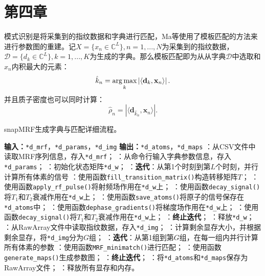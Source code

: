 \chapter{第四章}
\label{chap:chap4}
模式识别是将采集到的指纹数据和字典进行匹配，Ma等\cite{mrf}使用了模板匹配的方法来进行参数图的重建。记$X=\{x_n\in \mathbb{C}^L\}, n=1,...,N$为采集到的指纹数据，$\mathcal{D}=\{d_k\in \mathbb{C}^L\},k=1,...,K$为生成的字典。那么模板匹配即为从从字典$\mathcal{D}$中选取和$x_n$内积最大的元素：
	\begin{equation}
	\hat{k}_n = \operatorname*{arg\,max}_k \left|\left\langle \mathbf{d}_k,\mathbf{x}_n \right\rangle \right|.
	\end{equation}
并且质子密度也可以同时计算：
	\begin{equation}
	\hat{\rho}_n=\left|\langle \mathbf{d}_{\hat{k}_n},\mathbf{x}_n \rangle\right|.
	\end{equation}

\begin{algorithm}
	\caption{snapMRF生成字典与匹配详细流程。}
	\label{alg:snapMRF}
	\begin{algorithmic}
		\INDSTATE[-1.25] \textbf{输入：}\texttt{*d\_mrf}，\texttt{*d\_params}，\texttt{*d\_img}
		\INDSTATE[-1.25] \textbf{输出：}\texttt{*d\_atoms}，\texttt{*d\_maps}
		：从CSV文件中读取MRF序列信息，存入\texttt{*d\_mrf}；
		：从命令行输入字典参数信息，存入\texttt{*d\_params}；
		：初始化状态矩阵\texttt{*d\_w}；
		：\textbf{迭代}：从第1个时刻到第$L$个时刻，并行计算所有体素的信号
		：\qquad 使用函数\texttt{fill\_transition\_matrix()}构造转移矩阵$T$；
		：\qquad 使用函数\texttt{apply\_rf\_pulse()}将射频场作用在\texttt{*d\_w}上；
		：\qquad 使用函数\texttt{decay\_signal()}将$T_1$和$T_2$衰减作用在\texttt{*d\_w}上；
		：\qquad 使用函数\texttt{save\_atoms()}将原子的信号保存在\texttt{*d\_atoms}中；
		：\qquad 使用函数\texttt{dephase\_gradients()}将梯度场作用在\texttt{*d\_w}上；
		：\qquad 使用函数\texttt{decay\_signal()}将$T_1$和$T_2$衰减作用在\texttt{*d\_w}上；
		：\textbf{终止迭代}；
		：释放\texttt{*d\_w}；
		：从RawArray文件中读取指纹数据，存入\texttt{*d\_img}；
		：计算剩余显存大小，并根据剩余显存，将\texttt{*d\_img}分为$G$组；
		：\textbf{迭代}：从第1组到第$G$组，在每一组内并行计算所有体素的参数
		：\qquad 使用函数\texttt{MRF\_minimatch()}进行匹配；
		：\qquad 使用函数\texttt{generate\_maps()}生成参数图；
		：\textbf{终止迭代}；
		：将\texttt{*d\_atoms}和\texttt{*d\_maps}保存为RawArray文件；
		：释放所有显存和内存。
	\end{algorithmic}
\end{algorithm}











